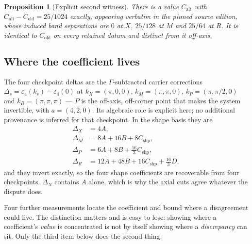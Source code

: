 \documentclass[11pt]{article}
\theoremstyle{plain}
\newtheorem{proposition}[theorem]{Proposition}
\theoremstyle{definition}
\theoremstyle{remark}
\newcommand{\chk}[1]{}
\begin{document}
\begin{proposition}[Explicit second witness]\label{prop:witness}
There is a value $C_{\mathrm{alt}}$ with
$C_{\mathrm{alt}}-C_{\mathrm{old}}=25/1024$ exactly, appearing verbatim in the
pinned source edition, whose induced band separations are $0$ at $X$,
$25/128$ at $M$ and $25/64$ at $R$. It is identical to
$C_{\mathrm{old}}$ on every retained datum and distinct from it off-axis.
\end{proposition}
\chk{FINDING: an explicit second witness C\_alt exhibits the C2 non-identifiability}
\chk{the C\_alt witness IS the balanced eps-free continuation, and Delta\_C/(A/2) = 15/32}

\subsection{Where the coefficient lives}

The four checkpoint deltas are the $\Gamma$-subtracted carrier corrections
$\Delta_s=\varepsilon_4(k_s)-\varepsilon_4(0)$ at
$k_X=(\pi,0,0)$, $k_M=(\pi,\pi,0)$, $k_P=(\pi,\pi/2,0)$ and
$k_R=(\pi,\pi,\pi)$ --- $P$ is the off-axis, off-corner point that makes the
system invertible, with $a=(4,2,0)$. Its algebraic role is explicit here; no
additional provenance is inferred for that checkpoint. In the shape basis they are
\begin{equation}\label{eq:checkpoints}
\begin{aligned}
  \Delta_X&=4A,\\
  \Delta_M&=8A+16B+8C_{\mathrm{shp}},\\
  \Delta_P&=6A+8B+\tfrac{16}3C_{\mathrm{shp}},\\
  \Delta_R&=12A+48B+16C_{\mathrm{shp}}+\tfrac{16}3D,
\end{aligned}
\end{equation}
and they invert exactly, so the four shape coefficients are recoverable from
four checkpoints. $\Delta_X$ contains $A$ alone, which is why the axial cuts
agree whatever the dispute does.
\chk{checkpoint values at X, M, P, R}
\chk{the four extraction formulas invert the ansatz}
\chk{X is blind to B, C, D — it fixes A alone}

Four further measurements locate the coefficient and bound where a
disagreement could live. The distinction matters and is easy to lose: showing
where a coefficient's \emph{value} is concentrated is not by itself showing
where a \emph{discrepancy} can sit. Only the third item below does the second
thing.
\end{document}
